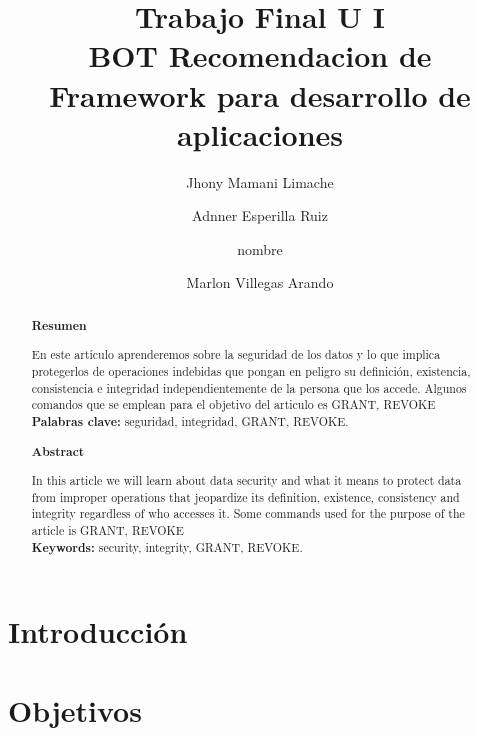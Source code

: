 \documentclass[%
 reprint,
 amsmath,amssymb,
 aps,
]{revtex4-1}
\begin{document}
\title{Trabajo Final U I  \\ BOT Recomendacion de Framework para desarrollo de aplicaciones }
\author{Jhony Mamani Limache}
\author{Adnner Esperilla Ruiz}
\author{nombre}
\author{Marlon Villegas Arando}
%

\begin{abstract}
\begin{center}
\textbf{Resumen}
\end{center}

En este artículo aprenderemos sobre la seguridad de los datos y lo que implica protegerlos de operaciones indebidas que pongan en peligro su definición, existencia, consistencia e integridad independientemente de la persona que los accede. Algunos comandos que se emplean para el objetivo del articulo es GRANT, REVOKE\\

\textbf{Palabras clave:}   seguridad, integridad, GRANT, REVOKE.\\

\begin{center}
\textbf{Abstract}
\end{center}
In this article we will learn about data security and what it means to protect data from improper operations that jeopardize its definition, existence, consistency and integrity regardless of who accesses it. Some commands used for the purpose of the article is GRANT, REVOKE\\
\textbf{Keywords:}   security, integrity, GRANT, REVOKE.\\

\end{abstract}



\maketitle


\section {Introducción}\label{sec:1}





\section{Objetivos}\label{sec:2}
\end{document}
